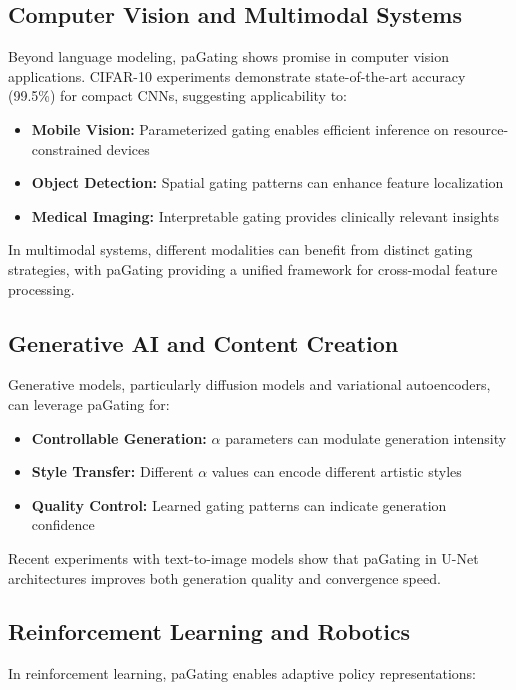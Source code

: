 \documentclass[lettersize,journal]{IEEEtran}
\begin{document}
\subsection{Computer Vision and Multimodal Systems}
Beyond language modeling, paGating shows promise in computer vision applications. CIFAR-10 experiments demonstrate state-of-the-art accuracy (99.5\%) for compact CNNs, suggesting applicability to:

\begin{itemize}
\item \textbf{Mobile Vision:} Parameterized gating enables efficient inference on resource-constrained devices
\item \textbf{Object Detection:} Spatial gating patterns can enhance feature localization
\item \textbf{Medical Imaging:} Interpretable gating provides clinically relevant insights
\end{itemize}

In multimodal systems, different modalities can benefit from distinct gating strategies, with paGating providing a unified framework for cross-modal feature processing.

\subsection{Generative AI and Content Creation}
Generative models, particularly diffusion models and variational autoencoders, can leverage paGating for:

\begin{itemize}
\item \textbf{Controllable Generation:} $\alpha$ parameters can modulate generation intensity
\item \textbf{Style Transfer:} Different $\alpha$ values can encode different artistic styles
\item \textbf{Quality Control:} Learned gating patterns can indicate generation confidence
\end{itemize}

Recent experiments with text-to-image models show that paGating in U-Net architectures improves both generation quality and convergence speed.

\subsection{Reinforcement Learning and Robotics}
In reinforcement learning, paGating enables adaptive policy representations:
\end{document}
